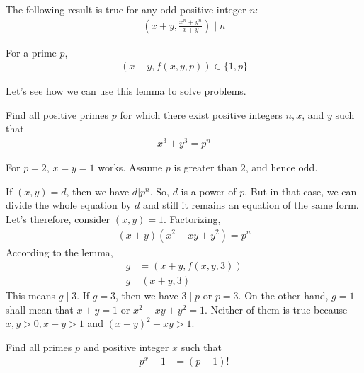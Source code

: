 \documentclass[main.tex]{subfile}
\begin{document}
	\begin{corollary}
		The following result is true for any odd positive integer $n$:
		\begin{align*}
			\left(x+y,\frac{x^n+y^n}{x+y}\right)\mid n
		\end{align*}
	\end{corollary}

	\begin{corollary}
		For a prime $p$,
		\begin{align*}
			(x-y,f(x,y,p))\in\{1,p\}
		\end{align*}
	\end{corollary}

Let's see how we can use this lemma to solve problems.

	\begin{problem}[Hungary 2000]
		Find all positive primes $p$ for which there exist positive
		integers $n,x$, and $y$ such that
		\begin{align*}
			x^3+y^3=p^n
		\end{align*}
	\end{problem}

	\begin{solution}
		For $p=2$, $x=y=1$ works. Assume $p$ is greater than $2$, and hence odd.

		If $(x, y)=d$, then we have $d|p^n$. So, $d$ is a power of $p$. But in that case, we can divide the whole equation by $d$ and still it remains an equation of the same form. Let's therefore, consider $(x, y)=1$. Factorizing,
		\begin{align*}
			(x+y)(x^2-xy+y^2)=p^n
		\end{align*}
		According to the lemma,
		\begin{align*}
			g
				& =\left(x+y, f(x, y, 3)\right)\\
			g
				& \mid (x+y,3)
		\end{align*}
		This means $g\mid 3$. If $g=3$, then we have $3\mid p$ or $p=3$. On the other hand, $g=1$ shall mean that $x+y=1$ or $x^2-xy+y^2=1$. Neither of them is true because $x,y>0,x+y>1$ and $(x-y)^2+xy>1$.
	\end{solution}

	\begin{problem}
		Find all primes $p$ and positive integer $x$ such that
			\begin{align*}
				p^x-1 & = (p-1)!
			\end{align*}
	\end{problem}
\end{document}

